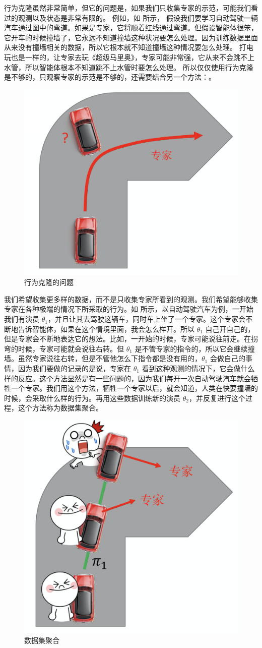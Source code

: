 行为克隆虽然非常简单，但它的问题是，如果我们只收集专家的示范，可能我们看过的观测以及状态是非常有限的。
例如，如 所示，
假设我们要学习自动驾驶一辆汽车通过图中的弯道。如果是专家，它将顺着红线通过弯道。但假设智能体很笨，它开车的时候撞墙了，它永远不知道撞墙这种状况要怎么处理。因为训练数据里面从来没有撞墙相关的数据，所以它根本就不知道撞墙这种情况要怎么处理。
打电玩也是一样的，让专家去玩《超级马里奥》，专家可能非常强，它从来不会跳不上水管，所以智能体根本不知道跳不上水管时要怎么处理。
所以仅仅使用行为克隆是不够的，只观察专家的示范是不够的，还需要结合另一个方法：。

\begin{figure}[htb]
   \centering
   \includegraphics[width=0.5\linewidth]{res/ch11/11.3}
   \caption{行为克隆的问题}
   \label{fig:BC_2}
\end{figure}

我们希望收集更多样的数据，而不是只收集专家所看到的观测。我们希望能够收集专家在各种极端的情况下所采取的行为。如 所示，以自动驾驶汽车为例，一开始我们有演员 $\theta_1$，并且让其去驾驶这辆车，同时车上坐了一个专家。这个专家会不断地告诉智能体，如果在这个情境里面，我会怎么样开。所以 $\theta_1$ 自己开自己的，但是专家会不断地表达它的想法。比如，一开始的时候，专家可能说往前走。在拐弯的时候，专家可能就会说往右转。但 $\theta_1$ 是不管专家的指令的，所以它会继续撞墙。虽然专家说往右转，但是不管他怎么下指令都是没有用的，$\theta_1$ 会做自己的事情，因为我们要做的记录的是说，专家在 $\theta_1$ 看到这种观测的情况下，它会做什么样的反应。这个方法显然是有一些问题的，因为我们每开一次自动驾驶汽车就会牺牲一个专家。我们用这个方法，牺牲一个专家以后，就会知道，人类在快要撞墙的时候，会采取什么样的行为。再用这些数据训练新的演员 $\theta_2$，并反复进行这个过程，这个方法称为数据集聚合。

\begin{figure}[htb]
   \centering
   \includegraphics[width=0.5\linewidth]{res/ch11/11.4}
   \caption{数据集聚合}
   \label{fig:BC_3}
\end{figure}

